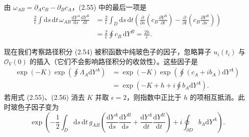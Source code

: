 \documentclass[11pt,a4paper,UTF8]{ctexart}
\theoremstyle{plain}
\theoremstyle{definition}
\begin{document}
由 $\omega_{AB}=\partial_Ac_B-\partial_Bc_A$，(2.55) 中的最后一项是
\begin{equation}
\begin{split}
    \frac{2}{\epsilon}\int \mathrm{d}s\,\mathrm{d}t\,\omega_{AB}\frac{\mathrm{d}Y^A}{\mathrm{d}s}\frac{\mathrm{d}Y^B}{\mathrm{d}t}
    &=\frac{2}{\epsilon}\int_D \mathrm{d}s\,\mathrm{d}t\left(\frac{\partial}{\partial s}\left(c_B\frac{\partial Y^B}{\partial t}\right)-\frac{\partial}{\partial t}\left(c_B\frac{\partial Y^B}{\partial s}\right)\right)\\
    &=\frac{2}{\epsilon}\oint c_B\,\mathrm{d}Y^B=\frac{2h}{\epsilon}.
\end{split}
    \tag{2.56}
\end{equation}


现在我们考察路径积分 (2.54) 被积函数中纯玻色子的因子，忽略算子 $u_i(t_i)$ 与 $\mathcal{O}_V(0)$ 的插入（它们不会影响路径积分的收敛性）。这些因子是
\begin{equation}
\begin{split}
    \exp(-K)\exp\left(\oint\Lambda_A\mathrm{d}Y^A\right)
    &=\exp(-K)\exp\left(\oint(c_A+ib_A)\mathrm{d}Y^A\right)\\
    &=\exp\left(-K+h+i\oint b_A\mathrm{d}Y^A\right).
\end{split}
    \tag{2.57}
\end{equation}
若用式 (2.55)、(2.56) 消去 $K$ 并取 $\epsilon=2$，则指数中正比于 $h$ 的项相互抵消。此时玻色子因子变为
\begin{equation}
    \exp\left(-\frac{1}{2}\int_D \mathrm{d}s\,\mathrm{d}t\,g_{AB}\left(\frac{\mathrm{d}Y^A}{\mathrm{d}s}\frac{\mathrm{d}Y^B}{\mathrm{d}s}+\frac{\mathrm{d}Y^A}{\mathrm{d}t}\frac{\mathrm{d}Y^B}{\mathrm{d}t}\right)+i\oint_{\partial D} b_A\mathrm{d}Y^A\right).
    \tag{2.58}
\end{equation}
\end{document}
